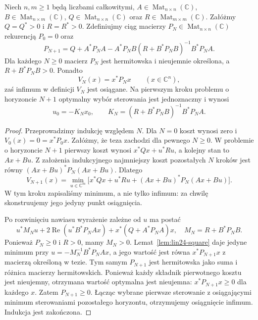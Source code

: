 \begin{twierdzenie}
\label{thm:lin24-dare-recursion}
Niech \(n,m\ge1\) będą liczbami całkowitymi,
\(A\in\operatorname{Mat}_{n\times n}(\mathbb C)\),
\(B\in\operatorname{Mat}_{n\times m}(\mathbb C)\),
\(Q\in\operatorname{Mat}_{n\times n}(\mathbb C)\)
oraz \(R\in\operatorname{Mat}_{m\times m}(\mathbb C)\).
Załóżmy \(Q=Q^*>0\) i \(R=R^*>0\).
Zdefiniujmy ciąg macierzy
\(P_N\in\operatorname{Mat}_{n\times n}(\mathbb C)\)
rekurencją \(P_0=0\) oraz
\[
 P_{N+1}
 =Q+A^*P_NA
  -A^*P_NB(R+B^*P_NB)^{-1}B^*P_NA.
\]
Dla każdego \(N\ge0\)
macierz \(P_N\) jest hermitowska
i nieujemnie określona,
a \(R+B^*P_NB>0\).
Ponadto
\[
 V_N(x)=x^*P_Nx
 \qquad(x\in\mathbb C^n),
\]
zaś infimum w definicji
\(V_N\) jest osiągane.
Na pierwszym kroku problemu
o horyzoncie \(N+1\)
optymalny wybór sterowania
jest jednoznaczny i wynosi
\[
 u_0=-K_Nx_0,\qquad
 K_N=(R+B^*P_NB)^{-1}B^*P_NA.
\]
\end{twierdzenie}
\begin{proof}
Przeprowadzimy indukcję
względem \(N\).
Dla \(N=0\) koszt wynosi zero
i \(V_0(x)=0=x^*P_0x\).
Załóżmy, że teza zachodzi
dla pewnego \(N\ge0\).
W problemie o horyzoncie \(N+1\)
pierwszy koszt wynosi
\(x^*Qx+u^*Ru\),
a kolejny stan to \(Ax+Bu\).
Z założenia indukcyjnego
najmniejszy koszt pozostałych
\(N\) kroków jest równy
\((Ax+Bu)^*P_N(Ax+Bu)\).
Dlatego
\[
 V_{N+1}(x)
 =\min_{u\in\mathbb C^m}
 \bigl[x^*Qx+u^*Ru+
       (Ax+Bu)^*P_N(Ax+Bu)\bigr].
\]
W tym kroku zapisaliśmy
minimum, a nie tylko infimum:
za chwilę skonstruujemy
jego jedyny punkt osiągnięcia.

Po rozwinięciu nawiasu
wyrażenie zależne od \(u\)
ma postać
\[
 u^*M_Nu+
  2\operatorname{Re}(u^*B^*P_NAx)
  +x^*(Q+A^*P_NA)x,
\quad M_N=R+B^*P_NB.
\]
Ponieważ \(P_N\ge0\)
i \(R>0\), mamy \(M_N>0\).
Lemat~\ref{lem:lin24-square}
daje jedyne minimum
przy \(u=-M_N^{-1}B^*P_NAx\),
a jego wartość jest równa
\(x^*P_{N+1}x\)
z macierzą określoną w tezie.
Tym samym \(P_{N+1}\)
jest hermitowska
jako suma i różnica
macierzy hermitowskich.
Ponieważ każdy składnik
pierwotnego kosztu jest
nieujemny, otrzymana wartość
optymalna jest nieujemna:
\(x^*P_{N+1}x\ge0\)
dla każdego \(x\).
Zatem \(P_{N+1}\ge0\).
Łącząc wybrane pierwsze
sterowanie z osiągającymi
minimum sterowaniami pozostałego
horyzontu, otrzymujemy
osiągnięcie infimum.
Indukcja jest zakończona.
\end{proof}

